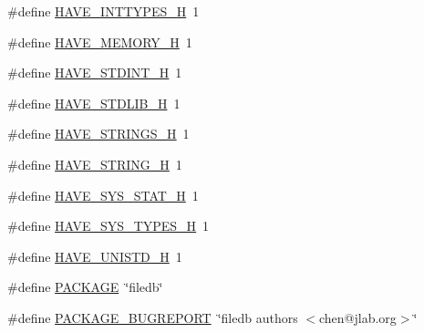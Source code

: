 \begin{DoxyCompactItemize}
\item 
\#define \mbox{\hyperlink{adat-devel_2build_2other__libs_2filedb_2src_2filedb__config__internal_8h_ab90a030ff2790ebdc176660a6dd2a478}{H\+A\+V\+E\+\_\+\+I\+N\+T\+T\+Y\+P\+E\+S\+\_\+H}}~1
\item 
\#define \mbox{\hyperlink{adat-devel_2build_2other__libs_2filedb_2src_2filedb__config__internal_8h_ae93a78f9d076138897af441c9f86f285}{H\+A\+V\+E\+\_\+\+M\+E\+M\+O\+R\+Y\+\_\+H}}~1
\item 
\#define \mbox{\hyperlink{adat-devel_2build_2other__libs_2filedb_2src_2filedb__config__internal_8h_ab6cd6d1c63c1e26ea2d4537b77148354}{H\+A\+V\+E\+\_\+\+S\+T\+D\+I\+N\+T\+\_\+H}}~1
\item 
\#define \mbox{\hyperlink{adat-devel_2build_2other__libs_2filedb_2src_2filedb__config__internal_8h_a9e0e434ec1a6ddbd97db12b5a32905e0}{H\+A\+V\+E\+\_\+\+S\+T\+D\+L\+I\+B\+\_\+H}}~1
\item 
\#define \mbox{\hyperlink{adat-devel_2build_2other__libs_2filedb_2src_2filedb__config__internal_8h_a405d10d46190bcb0320524c54eafc850}{H\+A\+V\+E\+\_\+\+S\+T\+R\+I\+N\+G\+S\+\_\+H}}~1
\item 
\#define \mbox{\hyperlink{adat-devel_2build_2other__libs_2filedb_2src_2filedb__config__internal_8h_ad4c234dd1625255dc626a15886306e7d}{H\+A\+V\+E\+\_\+\+S\+T\+R\+I\+N\+G\+\_\+H}}~1
\item 
\#define \mbox{\hyperlink{adat-devel_2build_2other__libs_2filedb_2src_2filedb__config__internal_8h_ace156430ba007d19b4348a950d0c692b}{H\+A\+V\+E\+\_\+\+S\+Y\+S\+\_\+\+S\+T\+A\+T\+\_\+H}}~1
\item 
\#define \mbox{\hyperlink{adat-devel_2build_2other__libs_2filedb_2src_2filedb__config__internal_8h_a69dc70bea5d1f8bd2be9740e974fa666}{H\+A\+V\+E\+\_\+\+S\+Y\+S\+\_\+\+T\+Y\+P\+E\+S\+\_\+H}}~1
\item 
\#define \mbox{\hyperlink{adat-devel_2build_2other__libs_2filedb_2src_2filedb__config__internal_8h_a219b06937831d0da94d801ab13987639}{H\+A\+V\+E\+\_\+\+U\+N\+I\+S\+T\+D\+\_\+H}}~1
\item 
\#define \mbox{\hyperlink{adat-devel_2build_2other__libs_2filedb_2src_2filedb__config__internal_8h_aca8570fb706c81df371b7f9bc454ae03}{P\+A\+C\+K\+A\+GE}}~\char`\"{}filedb\char`\"{}
\item 
\#define \mbox{\hyperlink{adat-devel_2build_2other__libs_2filedb_2src_2filedb__config__internal_8h_a1d1d2d7f8d2f95b376954d649ab03233}{P\+A\+C\+K\+A\+G\+E\+\_\+\+B\+U\+G\+R\+E\+P\+O\+RT}}~\char`\"{}filedb authors $<$chen@jlab.\+org$>$\char`\"{}

\end{DoxyCompactItemize}
